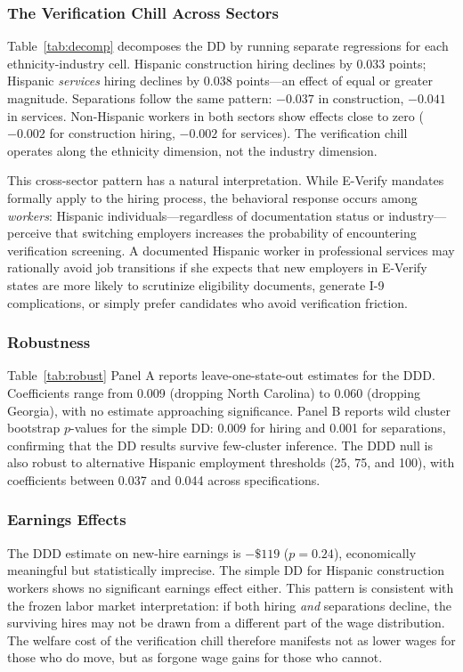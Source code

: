 \documentclass[12pt]{article}
\begin{document}


\subsubsection*{The Verification Chill Across Sectors} Table~\ref{tab:decomp} decomposes the DD by running separate regressions for each ethnicity-industry cell. Hispanic construction hiring declines by 0.033 points; Hispanic \emph{services} hiring declines by 0.038 points---an effect of equal or greater magnitude. Separations follow the same pattern: $-0.037$ in construction, $-0.041$ in services. Non-Hispanic workers in both sectors show effects close to zero ($-0.002$ for construction hiring, $-0.002$ for services). The verification chill operates along the ethnicity dimension, not the industry dimension.

This cross-sector pattern has a natural interpretation. While E-Verify mandates formally apply to the hiring process, the behavioral response occurs among \emph{workers}: Hispanic individuals---regardless of documentation status or industry---perceive that switching employers increases the probability of encountering verification screening. A documented Hispanic worker in professional services may rationally avoid job transitions if she expects that new employers in E-Verify states are more likely to scrutinize eligibility documents, generate I-9 complications, or simply prefer candidates who avoid verification friction.

\subsubsection*{Robustness} Table~\ref{tab:robust} Panel A reports leave-one-state-out estimates for the DDD. Coefficients range from 0.009 (dropping North Carolina) to 0.060 (dropping Georgia), with no estimate approaching significance. Panel B reports wild cluster bootstrap $p$-values for the simple DD: 0.009 for hiring and 0.001 for separations, confirming that the DD results survive few-cluster inference. The DDD null is also robust to alternative Hispanic employment thresholds (25, 75, and 100), with coefficients between 0.037 and 0.044 across specifications.



\subsubsection*{Earnings Effects} The DDD estimate on new-hire earnings is $-\$119$ ($p = 0.24$), economically meaningful but statistically imprecise. The simple DD for Hispanic construction workers shows no significant earnings effect either. This pattern is consistent with the frozen labor market interpretation: if both hiring \emph{and} separations decline, the surviving hires may not be drawn from a different part of the wage distribution. The welfare cost of the verification chill therefore manifests not as lower wages for those who do move, but as forgone wage gains for those who cannot.
\end{document}
